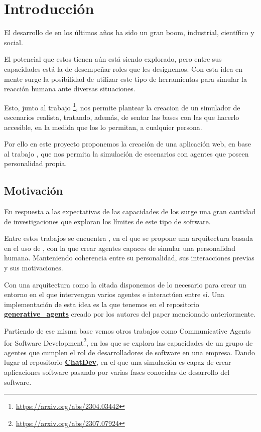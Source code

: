 \chapter{Introducción}
\label{cap:introduccion}


El desarrollo de \mgl en los últimos años ha sido un gran boom, industrial, científico y social.

El potencial que estos tienen aún está siendo explorado, pero entre sus capacidades está la de desempeñar roles que les designemos. Con esta idea en mente surge la posibilidad de utilizar este tipo de herramientas para simular la reacción humana ante diversas situaciones.

Esto, junto al trabajo \ga\footnote{\url{https://arxiv.org/abs/2304.03442}}, nos permite plantear la creacion de un simulador de escenarios realista, tratando, además, de sentar las bases con las que hacerlo accesible, en la medida que los \mgl lo permitan, a cualquier persona.

 Por ello en este proyecto proponemos la creación de una aplicación web, en base al trabajo \ga, que nos permita la simulación de escenarios con agentes que poseen personalidad propia. 

\section{Motivación}
En respuesta a las expectativas de las capacidades de los \mgl surge una gran cantidad de investigaciones que exploran los límites de este tipo de software.

Entre estos trabajos se encuentra \ga, en el que se propone una arquitectura basada en el uso de \mgl, con la que crear agentes capaces de simular una personalidad humana. Manteniendo coherencia entre su personalidad, sus interacciones previas y sus motivaciones.

Con una arquitectura como la citada disponemos de lo necesario para crear un entorno en el que intervengan varios agentes e interactúen entre sí. Una implementación de esta idea es la que tenemos en el repositorio \href{https://github.com/joonspk-research/generative_agents}{\textbf{generative\_agents}} creado por los autores del paper mencionado anteriormente.

Partiendo de ese misma base vemos otros trabajos como Communicative Agents for Software Development\footnote{\url{https://arxiv.org/abs/2307.07924}}, en los que se explora las capacidades de un grupo de agentes que cumplen el rol de desarrolladores de software en una empresa. Dando lugar al repositorio \href{https://github.com/OpenBMB/ChatDev}{\textbf{ChatDev}}, en el que una simulación es capaz de crear aplicaciones software pasando por varias fases conocidas de desarrollo del software.

